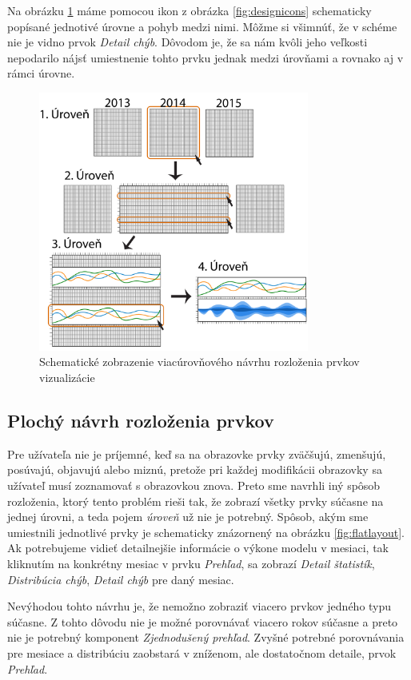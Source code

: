 Na obrázku \ref{fig:multilevellayout} máme pomocou ikon z obrázka \ref{fig:designicons} schematicky popísané jednotivé úrovne a pohyb medzi nimi. Môžme si všimnúť, že v schéme nie je vidno prvok \textit{Detail chýb}. Dôvodom je, že sa nám kvôli jeho veľkosti nepodarilo nájsť umiestnenie tohto prvku jednak medzi úrovňami a rovnako aj v rámci úrovne.

\begin{figure}
	\centering
	\includegraphics[width = 3.5in]{multilevellayout}
	\caption{Schematické zobrazenie viacúrovňového návrhu rozloženia prvkov vizualizácie}
	\label{fig:multilevellayout}
\end{figure}


\subsection{Plochý návrh rozloženia prvkov} %
Pre užívateľa nie je príjemné, keď sa na obrazovke prvky zväčšujú, zmenšujú, posúvajú, objavujú alebo miznú, pretože pri každej modifikácii obrazovky sa užívateľ musí zoznamovať s obrazovkou znova.
Preto sme navrhli iný spôsob rozloženia, ktorý tento problém rieši tak, že zobrazí všetky prvky súčasne na jednej úrovni, a teda pojem \textit{úroveň} už nie je potrebný. Spôsob, akým sme umiestnili jednotlivé prvky je schematicky znázornený na obrázku \ref{fig:flatlayout}. Ak potrebujeme vidieť detailnejšie informácie o výkone modelu v mesiaci, tak kliknutím na konkrétny mesiac v prvku \textit{Prehľad}, sa zobrazí \textit{Detail štatistík}, \textit{Distribúcia chýb}, \textit{Detail chýb} pre daný mesiac.

Nevýhodou tohto návrhu je, že nemožno zobraziť viacero prvkov jedného typu súčasne. Z tohto dôvodu nie je možné porovnávať viacero rokov súčasne a preto nie je potrebný komponent \textit{Zjednodušený prehľad}. Zvyšné potrebné porovnávania pre mesiace a distribúciu zaobstará v zníženom, ale dostatočnom detaile, prvok \textit{Prehľad}. 

